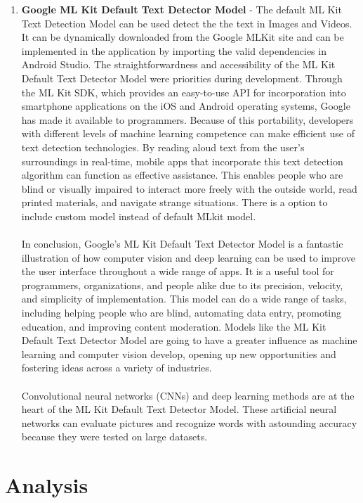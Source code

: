 \documentclass[MScCS]{uccthesis}
\begin{document}
\begin{enumerate}
    \item \textbf{Google ML Kit Default Text Detector Model} - The default ML Kit Text Detection Model can be used detect the the text in Images and Videos. It can be dynamically downloaded from the Google MLKit site and can be implemented in the application by importing the valid dependencies in Android Studio. The straightforwardness and accessibility of the ML Kit Default Text Detector Model were priorities during development. Through the ML Kit SDK, which provides an easy-to-use API for incorporation into smartphone applications on the iOS and Android operating systems, Google has made it available to programmers. Because of this portability, developers with different levels of machine learning competence can make efficient use of text detection technologies. By reading aloud text from the user's surroundings in real-time, mobile apps that incorporate this text detection algorithm can function as effective assistance. This enables people who are blind or visually impaired to interact more freely with the outside world, read printed materials, and navigate strange situations. There is a option to include custom model instead of default MLkit model. \\
    \\
    In conclusion, Google's ML Kit Default Text Detector Model is a fantastic illustration of how computer vision and deep learning can be used to improve the user interface throughout a wide range of apps. It is a useful tool for programmers, organizations, and people alike due to its precision, velocity, and simplicity of implementation. This model can do a wide range of tasks, including helping people who are blind, automating data entry, promoting education, and improving content moderation. Models like the ML Kit Default Text Detector Model are going to have a greater influence as machine learning and computer vision develop, opening up new opportunities and fostering ideas across a variety of industries.\\
    \\
    Convolutional neural networks (CNNs) and deep learning methods are at the heart of the ML Kit Default Text Detector Model. These artificial neural networks can evaluate pictures and recognize words with astounding accuracy because they were tested on large datasets.
    
\end{enumerate}

\chapter{Analysis}
\end{document}
